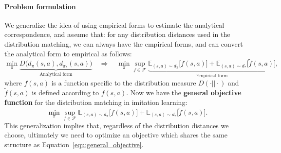 
\paragraph{Problem formulation} We generalize the idea of using empirical forms to estimate the analytical correspondence, and assume that: for any distribution distances used in the distribution matching, we can always have the empirical forms, and can convert the analytical form to empirical as follows:
\begin{equation*}
\min_{\pi} \underbrace{D\big(d_{\pi}(s, a), d_{\pi_*}(s, a)\big)}_{\text{Analytical form}} \quad \Rightarrow \quad \min_{\pi} \sup_{f\in\mathcal{F}} \underbrace{ \mathbb{E}_{(s, a)\sim d_{\pi}} \big[ f(s, a) \big] + \mathbb{E}_{(s, a)\sim d_*} \big[\tilde{f}(s, a) \big]}_{\text{Empirical form}},
\end{equation*}
where $f(s, a)$ is a function specific to the distribution measure $D(\cdot||\cdot)$ and $\tilde{f}(s, a)$ is defined according to $f(s, a)$.  Now we have the \textbf{general objective function} for the distribution matching in imitation learning:
\begin{equation}\label{equ:general_objective}
\min_{\pi} \sup_{f\in\mathcal{F}} \mathbb{E}_{(s, a)\sim d_{\pi}} \big[ f(s, a) \big] + \mathbb{E}_{(s, a)\sim d_*} \big[\tilde{f}(s, a) \big].
\end{equation}
This generalization implies that, regardless of the distribution distances we choose, ultimately we need to optimize an objective which shares the same structure as Equation~\ref{equ:general_objective}. 

